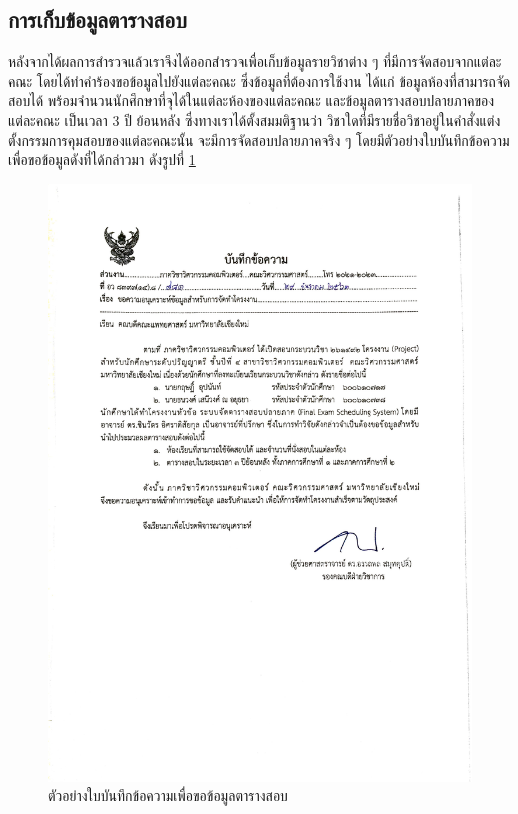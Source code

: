 \subsection{การเก็บข้อมูลตารางสอบ}
หลังจากได้ผลการสำรวจแล้วเราจึงได้ออกสำรวจเพื่อเก็บข้อมูลรายวิชาต่าง ๆ ที่มีการจัดสอบจากแต่ละคณะ โดยได้ทำคำร้องขอข้อมูลไปยังแต่ละคณะ ซึ่งข้อมูลที่ต้องการใช้งาน ได้แก่ ข้อมูลห้องที่สามารถจัดสอบได้ พร้อมจำนวนนักศึกษาที่จุได้ในแต่ละห้องของแต่ละคณะ
และข้อมูลตารางสอบปลายภาคของแต่ละคณะ เป็นเวลา 3 ปี ย้อนหลัง ซึ่งทางเราได้ตั้งสมมติฐานว่า วิชาใดที่มีรายชื่อวิชาอยู่ในคำสั่งแต่งตั้งกรรมการคุมสอบของแต่ละคณะนั้น จะมีการจัดสอบปลายภาคจริง ๆ
โดยมีตัวอย่างใบบันทึกข้อความเพื่อขอข้อมูลดังที่ได้กล่าวมา ดังรูปที่ \ref{fig:request-memo-scan}
\begin{figure}
  \begin{center}
    \includegraphics[width=\linewidth]{images/request_memo_scan.png}
  \end{center}
  \caption[ตัวอย่างใบบันทึกข้อความเพื่อขอข้อมูลตารางสอบ]{ตัวอย่างใบบันทึกข้อความเพื่อขอข้อมูลตารางสอบ}
  \label{fig:request-memo-scan}     
\end{figure}

